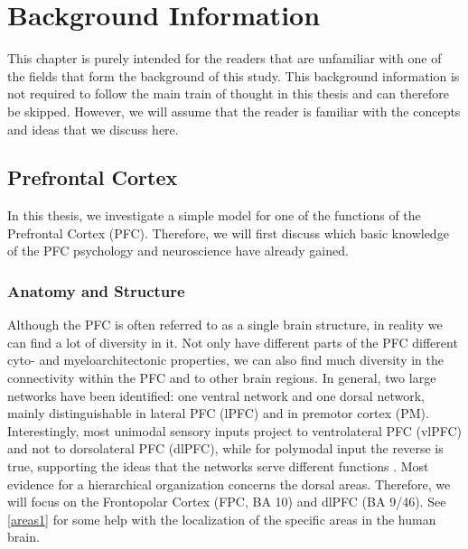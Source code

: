 \documentclass[10pt,a4paper]{report}
\begin{document}
\glsaddall
\printglossaries

\chapter{Background Information}
This chapter is purely intended for the readers that are unfamiliar with one of the fields that form the background of this study. This background information is not required to follow the main train of thought in this thesis and can therefore be skipped. However, we will assume that the reader is familiar with the concepts and ideas that we discuss here.

\section{Prefrontal Cortex}
In this thesis, we investigate a simple model for one of the functions of the Prefrontal Cortex (PFC). Therefore, we will first discuss which basic knowledge of the PFC psychology and neuroscience have already gained.

\subsection*{Anatomy and Structure}

Although the PFC is often referred to as a single brain structure, in reality we can find a lot of diversity in it. Not only have different parts of the PFC different cyto- and myeloarchitectonic properties, we can also find much diversity in the connectivity within the PFC and to other brain regions. In general, two large networks have been identified: one ventral network and one dorsal network, mainly distinguishable in lateral PFC (lPFC) and in premotor cortex (PM). Interestingly, most unimodal sensory inputs project to ventrolateral PFC (vlPFC) and not to dorsolateral PFC (dlPFC), while for polymodal input the reverse is true, supporting the ideas that the networks serve different functions \citep{Pandya1996, Tanji2008, Badre2009, Petrides2005}. Most evidence for a hierarchical organization concerns the dorsal areas. Therefore, we will focus on the Frontopolar Cortex (FPC, BA 10) and dlPFC (BA 9/46). See \ref{areas1} for some help with the localization of the specific areas in the human brain.
\end{document}
